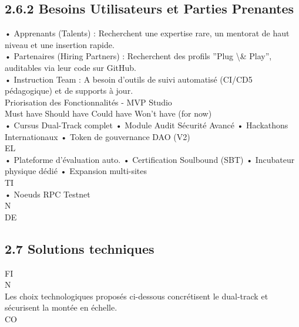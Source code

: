 \documentclass[12pt,landscape,a4paper]{article}
\begin{document}
\subsection{2.6.2 Besoins Utilisateurs et Parties Prenantes}
• Apprenants (Talents) : Recherchent une expertise rare, un mentorat de haut niveau et une insertion rapide.\\
• Partenaires (Hiring Partners) : Recherchent des profils ”Plug \textbackslash{}& Play”, auditables via leur code sur GitHub.\\
• Instruction Team : A besoin d’outils de suivi automatisé (CI/CD5 pédagogique) et de supports à jour.\\
\vspace{0.5em}
Priorisation des Fonctionnalités - MVP Studio\\
\vspace{0.5em}
\vspace{0.5em}
\vspace{0.5em}
Must have                               Should have                             Could have                               Won’t have (for now)\\
• Cursus Dual-Track complet             • Module Audit Sécurité Avancé          • Hackathons Internationaux              • Token de gouvernance DAO (V2)\\
\vspace{0.5em}
\vspace{0.5em}
\vspace{0.5em}
\vspace{0.5em}
EL\\
• Plateforme d’évaluation auto.         • Certification Soulbound (SBT)         • Incubateur physique dédié              • Expansion multi-sites\\
\vspace{0.5em}
\vspace{0.5em}
\vspace{0.5em}
\vspace{0.5em}
TI\\
• Noeuds RPC Testnet\\
\vspace{0.5em}
\vspace{0.5em}
\vspace{0.5em}
\vspace{0.5em}
N\\
DE\\
\subsection{2.7 Solutions techniques}
\vspace{0.5em}
\vspace{0.5em}
\vspace{0.5em}
FI\\
N\\
Les choix technologiques proposés ci-dessous concrétisent le dual-track et sécurisent la montée en échelle.\\
CO\\
\end{document}
